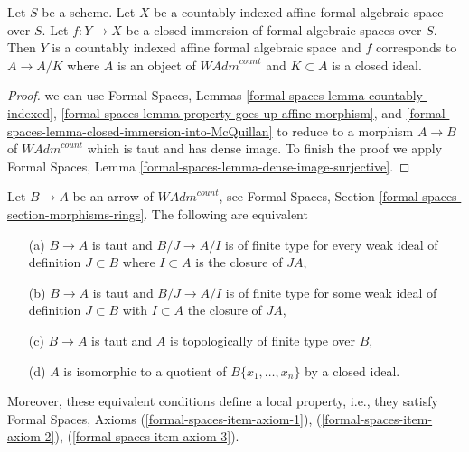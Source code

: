 \begin{lemma}
\label{lemma-closed-immersion-into-countably-indexed}
Let $S$ be a scheme. Let $X$ be a countably indexed affine formal algebraic
space over $S$. Let $f : Y \to X$ be a closed immersion of formal algebraic
spaces over $S$. Then $Y$ is a countably indexed affine formal algebraic space
and $f$ corresponds to $A \to A/K$ where $A$ is an object of
$\textit{WAdm}^{count}$ and $K \subset A$ is a closed ideal.
\end{lemma}

\begin{proof}
we can use
Formal Spaces, Lemmas \ref{formal-spaces-lemma-countably-indexed},
\ref{formal-spaces-lemma-property-goes-up-affine-morphism}, and
\ref{formal-spaces-lemma-closed-immersion-into-McQuillan}
to reduce to a morphism $A \to B$ of $\textit{WAdm}^{count}$
which is taut and has dense image.
To finish the proof we apply
Formal Spaces, Lemma \ref{formal-spaces-lemma-dense-image-surjective}.
\end{proof}

\begin{lemma}
\label{lemma-quotient-restricted-power-series}
Let $B \to A$ be an arrow of $\textit{WAdm}^{count}$, see
Formal Spaces, Section \ref{formal-spaces-section-morphisms-rings}.
The following are equivalent
\begin{enumerate}
\item[(a)] $B \to A$ is taut and $B/J \to A/I$ is of finite type for
every weak ideal of definition $J \subset B$ where $I \subset A$ is the
closure of $JA$,
\item[(b)] $B \to A$ is taut and $B/J \to A/I$ is of finite type for
some weak ideal of definition $J \subset B$ with $I \subset A$ the
closure of $JA$,
\item[(c)] $B \to A$ is taut and $A$ is topologically of finite
type over $B$,
\item[(d)] $A$ is isomorphic to a quotient of $B\{x_1, \ldots, x_n\}$
by a closed ideal.
\end{enumerate}
Moreover, these equivalent conditions define a local property,
i.e., they satisfy Formal Spaces, Axioms (\ref{formal-spaces-item-axiom-1}),
(\ref{formal-spaces-item-axiom-2}), (\ref{formal-spaces-item-axiom-3}).
\end{lemma}

